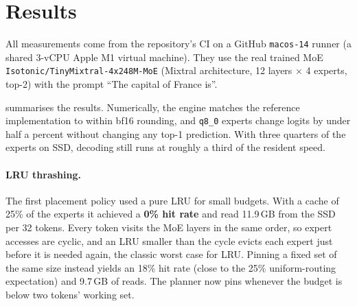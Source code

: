 \documentclass[11pt]{article}
\begin{document}
\section{Results}
\label{sec:results}

All measurements come from the repository's CI on a GitHub \texttt{macos-14} runner (a shared
3-vCPU Apple M1 virtual machine). They use the real trained MoE
\texttt{Isotonic/TinyMixtral-4x248M-MoE} (Mixtral architecture, 12 layers $\times$ 4 experts,
top-2) with the prompt ``The capital of France is''.

\begin{table}[t]
\centering
\caption{Measured on a GitHub \texttt{macos-14} runner (Apple M1 VM) with TinyMixtral-4x248M-MoE.}
\label{tab:measured}
\end{table}

 summarises the results. Numerically, the engine matches the reference
implementation to within bf16 rounding, and \texttt{q8\_0} experts change logits by under half a
percent without changing any top-1 prediction. With three quarters of the experts on SSD,
decoding still runs at roughly a third of the resident speed.

\paragraph{LRU thrashing.} The first placement policy used a pure LRU for small budgets.
With a cache of 25\% of the experts it achieved a \textbf{0\% hit rate} and read 11.9\,GB from
the SSD per 32 tokens. Every token visits the MoE layers in the same order, so expert accesses
are cyclic, and an LRU smaller than the cycle evicts each expert just before it is needed
again, the classic worst case for LRU. Pinning a fixed set of the same size instead yields an
18\% hit rate (close to the 25\% uniform-routing expectation) and 9.7\,GB of reads. The planner
now pins whenever the budget is below two tokens' working set.
\end{document}
